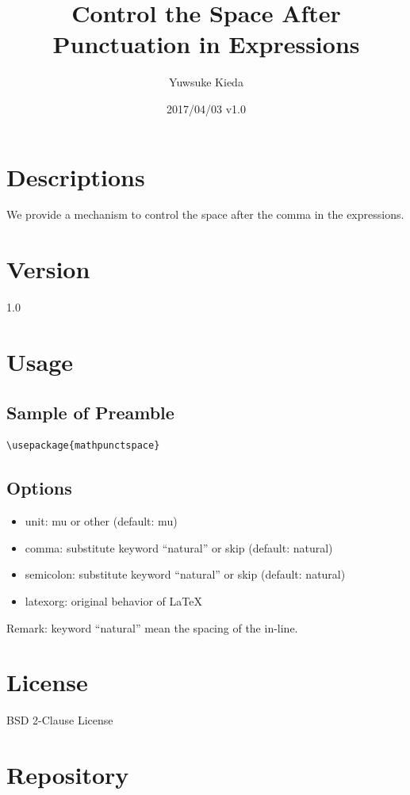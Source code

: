 \documentclass{article}
\title{Control the Space After Punctuation in Expressions}
\author{Yuwsuke Kieda}
\date{2017/04/03 v1.0}
\begin{document}
\maketitle

\section{Descriptions}

We provide a mechanism to control the space after the comma in the expressions.

\section{Version}

1.0

\section{Usage}

\subsection{Sample of Preamble}

\begin{verbatim}
\usepackage{mathpunctspace}
\end{verbatim}

\subsection{Options}

\begin{itemize}
 \item unit: mu or other (default: mu)
 \item comma: substitute keyword ``natural'' or skip (default: natural)
 \item semicolon: substitute keyword ``natural'' or skip (default: natural)
 \item latexorg: original behavior of LaTeX
\end{itemize}

Remark: keyword ``natural'' mean the spacing of the in-line.

\section{License}

BSD 2-Clause License

\section{Repository}
\end{document}
